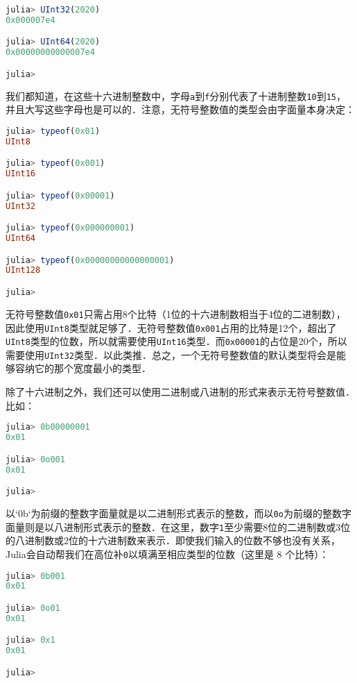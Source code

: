 \begin{lstlisting}[language=julia]
julia> UInt32(2020)
0x000007e4

julia> UInt64(2020)
0x00000000000007e4

julia> 
\end{lstlisting}

我们都知道，在这些十六进制整数中，字母\verb|a|到\verb|f|分别代表了十进制整数\verb|10|到\verb|15|，并且大写这些字母也是可以的．注意，无符号整数值的类型会由字面量本身决定：

\begin{lstlisting}[language=julia]
julia> typeof(0x01)
UInt8

julia> typeof(0x001)
UInt16

julia> typeof(0x00001)
UInt32

julia> typeof(0x000000001)
UInt64

julia> typeof(0x00000000000000001)
UInt128

julia> 
\end{lstlisting}

无符号整数值\verb|0x01|只需占用8个比特（1位的十六进制数相当于4位的二进制数），因此使用\verb|UInt8|类型就足够了．无符号整数值\verb|0x001|占用的比特是12个，超出了\verb|UInt8|类型的位数，所以就需要使用\verb|UInt16|类型．而\verb|0x00001|的占位是20个，所以需要使用\verb|UInt32|类型．以此类推．总之，一个无符号整数值的默认类型将会是能够容纳它的那个宽度最小的类型．

除了十六进制之外，我们还可以使用二进制或八进制的形式来表示无符号整数值．比如：

\begin{lstlisting}[language=julia]
julia> 0b00000001
0x01

julia> 0o001
0x01

julia> 
\end{lstlisting}

以`0b`为前缀的整数字面量就是以二进制形式表示的整数，而以\verb|0o|为前缀的整数字面量则是以八进制形式表示的整数．在这里，数字\verb|1|至少需要8位的二进制数或3位的八进制数或2位的十六进制数来表示．即使我们输入的位数不够也没有关系，Julia会自动帮我们在高位补\verb|0|以填满至相应类型的位数（这里是 8 个比特）：

\begin{lstlisting}[language=julia]
julia> 0b001
0x01

julia> 0o01
0x01

julia> 0x1
0x01

julia>
\end{lstlisting}

